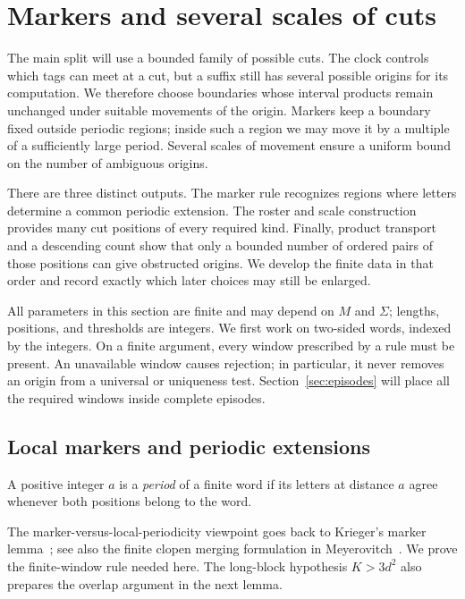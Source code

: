 \section{Markers and several scales of cuts}\label{sec:scales}

The main split will use a bounded family of possible cuts.  The clock
controls which tags can meet at a cut, but a suffix still has several
possible origins for its computation.  We therefore choose boundaries
whose interval products remain unchanged under suitable movements of the
origin.  Markers keep a boundary fixed outside periodic regions; inside
such a region we may move it by a multiple of a sufficiently large
period.  Several scales of movement ensure a uniform bound on the
number of ambiguous origins.

There are three distinct outputs. The marker rule recognizes regions where
letters determine a common periodic extension. The roster and scale
construction provides many cut positions of every required kind. Finally,
product transport and a descending count show that only a bounded number
of ordered pairs of those positions can give obstructed origins. We develop
the finite data in that order and record exactly which later choices may
still be enlarged.

All parameters in this section are finite and may depend on $M$ and
$\Sigma$; lengths, positions, and thresholds are integers.  We first
work on two-sided words, indexed by the integers.
On a finite argument, every window prescribed by a rule must be present.
An unavailable window causes rejection; in particular, it never removes
an origin from a universal or uniqueness test.  Section~\ref{sec:episodes}
will place all the required windows inside complete episodes.

\subsection{Local markers and periodic extensions}

A positive integer $a$ is a \emph{period} of a finite word if its letters
at distance $a$ agree whenever both positions belong to the word.

The marker-versus-local-periodicity viewpoint goes back to Krieger's marker
lemma~\cite[Lemma~2]{Krieger1982}; see also the finite clopen merging
formulation in Meyerovitch~\cite[Section~3, Lemmas~3.2--3.4]{Meyerovitch2025}.
We prove the finite-window rule needed here. The long-block hypothesis
$K>3d^2$ also prepares the overlap argument in the next lemma.

